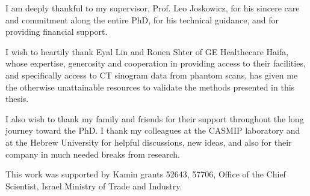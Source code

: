 \thispagestyle{empty}
I am deeply thankful to my supervisor, Prof. Leo Joskowicz, for his sincere care and commitment along the entire PhD, for his technical guidance, and for providing financial support.

I wish to heartily thank Eyal Lin and Ronen Shter of GE Healthecare Haifa, whose expertise, generosity and cooperation in providing access to their facilities, and specifically access to CT sinogram data from phantom scans, has given me the otherwise unattainable resources to validate the methods presented in this thesis.

I also wish to thank my family and friends for their support throughout the long journey toward the PhD. I thank my colleagues at the CASMIP laboratory and at the Hebrew University for helpful discussions, new ideas, and also for their company in much needed breaks from research.

This work was supported by Kamin grants 52643, 57706, Office of the Chief Scientist, Israel Ministry of Trade and Industry.
